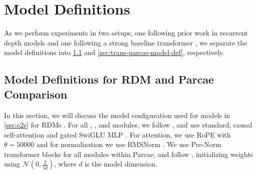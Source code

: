 \section{Model Definitions}
\label{sec:model-definitions}

As we perform experiments in two setups, one following prior work in recurrent depth models \citep{geiping_scaling_2025} and one following a strong baseline transformer \citep{nanochat}, we separate the model definitions into \cref{sec:rdm-parcae-model-def} and \cref{sec:trans-parcae-model-def}, respectively.

\subsection{Model Definitions for RDM and Parcae Comparison}
\label{sec:rdm-parcae-model-def}

In this section, we will discuss the model configuration used for models in \cref{sec:e2e} for RDMs \citep{geiping_scaling_2025}. For all \prelude, \recurrent, and \coda modules, we follow \citet{geiping_scaling_2025}, and use standard, causal self-attention and gated SwiGLU MLP \citep{shazeer2020gluvariantsimprovetransformer}. For attention, we use RoPE \citep{su2023roformerenhancedtransformerrotary} with $\theta=50000$ and for normalization we use RMSNorm \citep{zhang2019rootmeansquarelayer}. We use Pre-Norm transformer blocks for all modules within Parcae, and follow \citet{takase2025spikemorestabilizingpretraining}, initializing weights using $\mathcal{N}(0,\frac{2}{5d})$, where $d$ is the model dimension.

